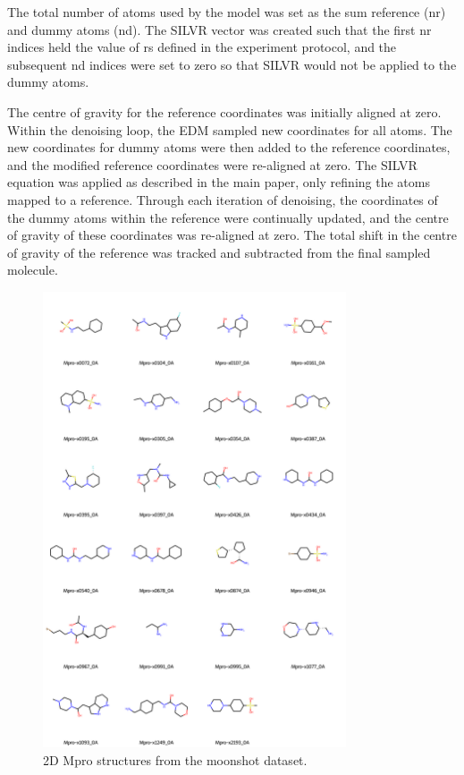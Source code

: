 \documentclass[journal=jacsat,manuscript=article]{achemso}
\begin{document}
\begin{suppinfo}
The total number of atoms used by the model was set as the sum reference (nr) and dummy atoms (nd). The SILVR vector was created such that the first nr indices held the value of rs defined in the experiment protocol, and the subsequent nd indices were set to zero so that SILVR would not be applied to the dummy atoms. 

The centre of gravity for the reference coordinates was initially aligned at zero. Within the denoising loop, the EDM sampled new coordinates for all atoms. The new coordinates for dummy atoms were then added to the reference coordinates, and the modified reference coordinates were re-aligned at zero. The SILVR equation was applied as described in the main paper, only refining the atoms mapped to a reference. Through each iteration of denoising, the coordinates of the dummy atoms within the reference were continually updated, and the centre of gravity of these coordinates was re-aligned at zero. The total shift in the centre of gravity of the reference was tracked and subtracted from the final sampled molecule. 


\begin{figure}
    \centering
    \includegraphics[width=0.8\textwidth]{paper/Figures/FigS1/mpro_ligands_grid_2d.png}
    \caption{2D Mpro structures from the moonshot dataset.}
    \label{fig:moonshot_data}
\end{figure}
\newpage


\end{suppinfo}
\end{document}
